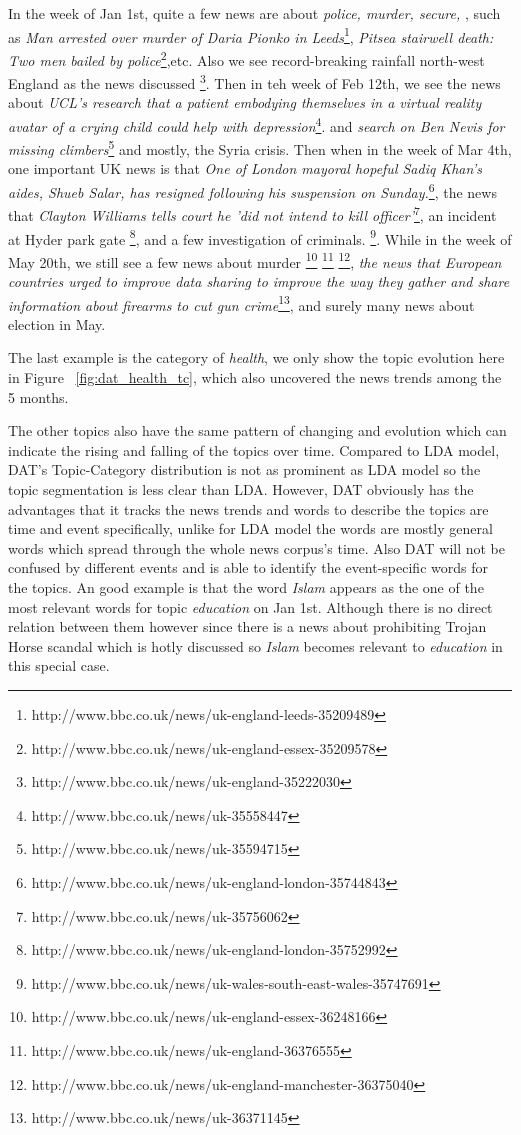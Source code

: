 In the week of Jan 1st, quite a few news are about \textit{police, murder, secure, }, such as \textit{Man arrested over murder of Daria Pionko in Leeds}\footnote{http://www.bbc.co.uk/news/uk-england-leeds-35209489}, \textit{Pitsea stairwell death: Two men bailed by police}\footnote{http://www.bbc.co.uk/news/uk-england-essex-35209578},etc. Also we see record-breaking rainfall north-west England as the news discussed \footnote{http://www.bbc.co.uk/news/uk-england-35222030}. Then in teh week of Feb 12th, we see the news about \textit{UCL's research that a patient embodying themselves in a virtual reality avatar of a crying child could help with depression}\footnote{http://www.bbc.co.uk/news/uk-35558447}. and \textit{search on Ben Nevis for missing climbers}\footnote{http://www.bbc.co.uk/news/uk-35594715} and mostly, the Syria crisis. Then when in the week of Mar 4th, one important UK news is that \textit{One of London mayoral hopeful Sadiq Khan's aides, Shueb Salar, has resigned following his suspension on Sunday.}\footnote{http://www.bbc.co.uk/news/uk-england-london-35744843}, the news that \textit{Clayton Williams tells court he 'did not intend to kill officer'}\footnote{http://www.bbc.co.uk/news/uk-35756062}, an incident at Hyder park gate \footnote{http://www.bbc.co.uk/news/uk-england-london-35752992}, and a few investigation of criminals. \footnote{http://www.bbc.co.uk/news/uk-wales-south-east-wales-35747691}. While in the week of May 20th, we still see a few news about murder \footnote{http://www.bbc.co.uk/news/uk-england-essex-36248166} \footnote{http://www.bbc.co.uk/news/uk-england-36376555} \footnote{http://www.bbc.co.uk/news/uk-england-manchester-36375040}, \textit{the news that European countries urged to improve data sharing to improve the way they gather and share information about firearms to cut gun crime}\footnote{http://www.bbc.co.uk/news/uk-36371145}, and surely many news about election in May.

The last example is the category of \textit{health}, we only show the topic evolution here in Figure ~\ref{fig:dat_health_tc}, which also uncovered the news trends among the 5 months.


The other topics also have the same pattern of changing and evolution which can indicate the rising and falling of the topics over time. Compared to LDA model, DAT's Topic-Category distribution is not as prominent as LDA model so the topic segmentation is less clear than LDA. However, DAT obviously has the advantages that it tracks the news trends and words to describe the topics are time and event specifically, unlike for LDA model the words are mostly general words which spread through the whole news corpus's time. Also DAT will not be confused by different events and is able to identify the event-specific words for the topics. An good example is that the word \textit{Islam} appears as the one of the most relevant words for topic \textit{education} on Jan 1st. Although there is no direct relation between them however since there is a news about prohibiting Trojan Horse scandal which is hotly discussed so \textit{Islam} becomes relevant to \textit{education} in this special case.

